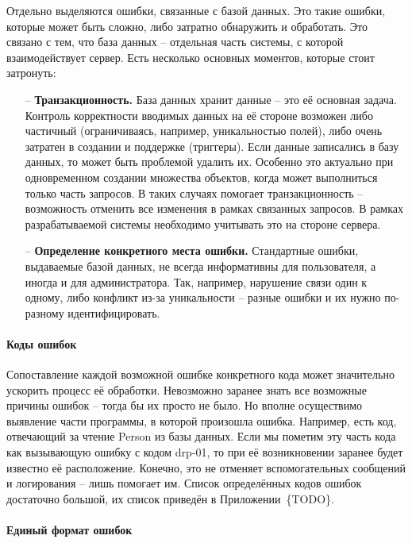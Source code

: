 \documentclass[a4paper,article]{article}
\begin{document}
\begin{sloppypar}
    Отдельно выделяются ошибки, связанные с базой данных. Это такие ошибки, которые может быть сложно, либо затратно обнаружить и обработать. Это связано с тем, что база данных -- отдельная часть системы, с которой взаимодействует сервер. Есть несколько основных моментов, которые стоит затронуть:

    \begin{itemize}[nolistsep]
        \item[--] \textbf{Транзакционность.} База данных хранит данные -- это её основная задача. Контроль корректности вводимых данных на её стороне возможен либо частичный (ограничиваясь, например, уникальностью полей), либо очень затратен в создании и поддержке (триггеры). Если данные записались в базу данных, то может быть проблемой удалить их. Особенно это актуально при одновременном создании множества объектов, когда может выполниться только часть запросов. В таких случаях помогает транзакционность -- возможность отменить все изменения в рамках связанных запросов. В рамках разрабатываемой системы необходимо учитывать это на стороне сервера.
        \item[--] \textbf{Определение конкретного места ошибки.} Стандартные ошибки, выдаваемые базой данных, не всегда информативны для пользователя, а иногда и для администратора. Так, например, нарушение связи один к одному, либо конфликт из-за уникальности -- разные ошибки и их нужно по-разному идентифицировать.
    \end{itemize}

    \paragraph{Коды ошибок}\label{Проектирование сервера. Коды ошибок}

    Сопоставление каждой возможной ошибке конкретного кода может значительно ускорить процесс её обработки. Невозможно заранее знать все возможные причины ошибок -- тогда бы их просто не было. Но вполне осуществимо выявление части программы, в которой произошла ошибка. Например, есть код, отвечающий за чтение Person из базы данных. Если мы пометим эту часть кода как вызывающую ошибку с кодом drp-01, то при её возникновении заранее будет известно её расположение. Конечно, это не отменяет вспомогательных сообщений и логирования -- лишь помогает им. Список определённых кодов ошибок достаточно большой, их список приведён в Приложении~\{TODO\}.

    \paragraph{Единый формат ошибок}\label{Единый формат ошибок}


\end{sloppypar}
\end{document}

